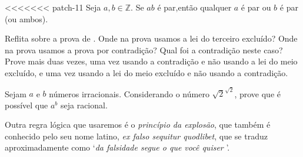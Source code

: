 \begin{itemizar}
\begin{axiom}
\begin{proposition}
\label{propIfProductEvenThenSomeFactorEven}
<<<<<<< patch-11
Seja $a,b \in \mathbb{Z}$. Se $ab$ é par,então qualquer $a$ é par ou $b$ é par (ou ambos).
\end{proposition}

\begin{exercise}
Reflita sobre a prova de . Onde na prova usamos a lei do terceiro excluído? Onde na prova usamos a prova por contradição? Qual foi a contradição neste caso? Prove  mais duas vezes, uma vez usando a contradição e não usando a lei do meio excluído, e uma vez usando a lei do meio excluído e não usando a contradição.
\end{exercise}

\begin{exercise}
Sejam $a$ e $b$ números irracionais. Considerando o número $\sqrt{2}^{\sqrt{2}}$, prove que é possível que $a^b$ seja racional.
\end{exercise}

Outra regra lógica que usaremos é o \textit{princípio da explosão}, que também é conhecido pelo seu nome latino, \textit{ex falso sequitur quodlibet}, que se traduz aproximadamente como `\textit{da falsidade segue o que você quiser} '.


\end{axiom}
\end{itemizar}
